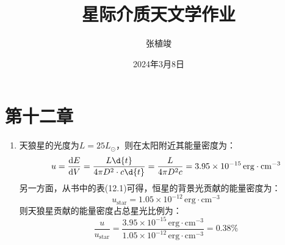 \documentclass[a4paper,fontset=none]{ctexart}
\title{\textbf{星际介质天文学作业}}
\author{张植竣}
\date{2024年3月8日}
\begin{document}
\maketitle

\section*{第十二章}

\begin{enumerate}
    \item[12.1]
    天狼星的光度为$L = 25L_\odot$，则在太阳附近其能量密度为：
    \[
        u = \odv{E}{V} = \frac{L\d{t}}{4\pi D^2 \cdot c\d{t}} = \frac{L}{4\pi D^2 c} = 3.95 \times 10^{-15}\,\mathrm{erg \cdot cm^{-3}}
    \]
    另一方面，从书中的表(12.1)可得，恒星的背景光贡献的能量密度为：
    \[
        u_{\mathrm{star}} = 1.05 \times 10^{-12}\,\mathrm{erg \cdot cm^{-3}}
    \]
    则天狼星贡献的能量密度占总星光比例为：
    \[
        \frac{u}{u_{\mathrm{star}}} = \frac{3.95 \times 10^{-15}\,\mathrm{erg \cdot cm^{-3}}}{1.05 \times 10^{-12}\,\mathrm{erg \cdot cm^{-3}}} = 0.38\%
    \]


\end{enumerate}
\end{document}
